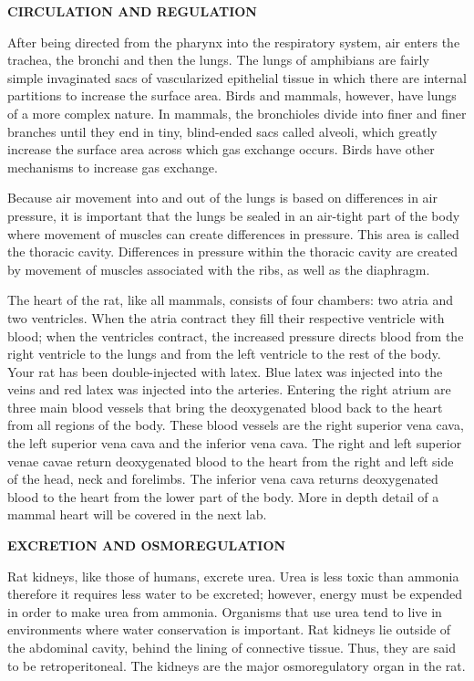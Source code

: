 \documentclass[
]{book}
\begin{document}
\textbf{CIRCULATION AND REGULATION}

After being directed from the pharynx into the respiratory system, air enters the trachea, the bronchi and then the lungs. The lungs of amphibians are fairly simple invaginated sacs of vascularized epithelial tissue in which there are internal partitions to increase the surface area. Birds and mammals, however, have lungs of a more complex nature. In mammals, the bronchioles divide into finer and finer branches until they end in tiny, blind-ended sacs called alveoli, which greatly increase the surface area across which gas exchange occurs. Birds have
other mechanisms to increase gas exchange.

Because air movement into and out of the lungs is based on differences in air pressure, it is important that the lungs be sealed in an air-tight part of the body where movement of muscles
can create differences in pressure. This area is called the thoracic cavity. Differences in pressure
within the thoracic cavity are created by movement of muscles associated with the ribs, as well as the diaphragm.

The heart of the rat, like all mammals, consists of four chambers: two atria and two ventricles. When the atria contract they fill their respective ventricle with blood; when the ventricles contract, the increased pressure directs blood from the right ventricle to the lungs and from the left ventricle to the rest of the body. Your rat has been double-injected with latex. Blue latex was injected into the veins and red latex was injected into the arteries. Entering the right atrium are three main blood vessels that bring the deoxygenated blood back to the heart from all regions of the body. These blood vessels are the right superior vena cava, the left superior vena cava and the inferior vena cava. The right and left superior venae cavae return deoxygenated blood to the heart from the right and left side of the head, neck and forelimbs. The inferior vena cava returns deoxygenated blood to the heart from the lower part of the body. More in depth detail of a mammal heart will be covered in the next lab.

\textbf{EXCRETION AND OSMOREGULATION}

Rat kidneys, like those of humans, excrete urea. Urea is less toxic than ammonia therefore it requires less water to be excreted; however, energy must be expended in order to make urea from ammonia. Organisms that use urea tend to live in environments where water conservation
is important. Rat kidneys lie outside of the abdominal cavity, behind the lining of connective tissue. Thus, they are said to be retroperitoneal. The kidneys are the major osmoregulatory organ in the rat.
\end{document}

